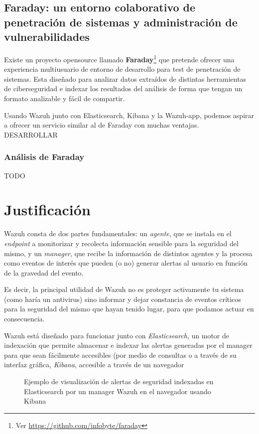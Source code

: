 \subsection{Faraday: un entorno colaborativo de penetración de sistemas y administración de vulnerabilidades}

Existe un proyecto opensource llamado \textbf{Faraday}\footnote{Ver \url{https://github.com/infobyte/faraday}} que pretende ofrecer una experiencia multiusuario de entorno de desarrollo para test de penetración de sistemas. Esta diseñado para analizar datos extraídos de distintas herramientas de ciberseguridad e indexar los resultados del análisis de forma que tengan un formato analizable y fácil de compartir. 

Usando Wazuh junto con Elasticsearch, Kibana y la Wazuh-app, podemos aspirar a ofrecer un servicio similar al de Faraday con muchas ventajas. DESARROLLAR

\subsubsection{Análisis de Faraday}

TODO

\section{Justificación}

Wazuh consta de dos partes fundamentales: un \textit{agente}, que se instala en el \textit{endpoint} a monitorizar y recolecta información sensible para la seguridad del mismo, y un \textit{manager}, que recibe la información de distintos agentes y la procesa como eventos de interés que pueden (o no) generar alertas al usuario en función de la gravedad del evento.

Es decir, la principal utilidad de Wazuh no es proteger activamente tu sistema (como haría un antivirus) sino informar y dejar constancia de eventos críticos para la seguridad del mismo que hayan tenido lugar, para que podamos actuar en consecuencia.

Wazuh está diseñado para funcionar junto con \textit{Elasticsearch}, un motor de indexación que permite almacenar e indexar las alertas generadas por el manager para que sean fácilmente accesibles (por medio de consultas o a través de su interfaz gráfica, \textit{Kibana}, accesible a través de un navegador

\begin{figure}[hbt]
  \centering
  \caption{Ejemplo de visualización de alertas de seguridad indexadas en Elasticsearch por un manager Wazuh en el navegador usando Kibana}
\end{figure}

